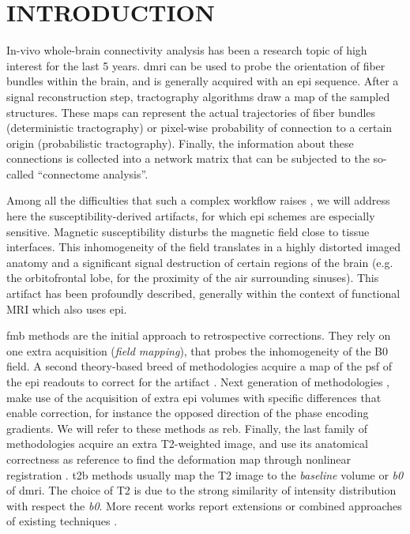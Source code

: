 \section{INTRODUCTION}
\label{sec:intro}
In-vivo whole-brain connectivity analysis has been a
research topic of high interest for the last
5 years. 
\Gls*{dmri} can be used to probe the
orientation of fiber bundles within the brain,
and is generally acquired with an \gls*{epi} sequence.
After a signal reconstruction step, 
tractography algorithms draw a map of the sampled 
structures.
These maps can represent the actual trajectories
of fiber bundles (deterministic tractography) or
pixel-wise probability of connection to a certain origin
(probabilistic tractography). Finally, the
information about these connections is collected
into a network matrix that can be subjected to
the so-called ``connectome analysis''.

Among all the difficulties that such a complex workflow
raises \cite{jones_twenty-five_2010}, we will
address here the susceptibility-derived artifacts,
for which \Gls*{epi} schemes are especially sensitive.
Magnetic susceptibility disturbs the magnetic field 
close to tissue interfaces. This inhomogeneity 
of the field translates in a highly distorted imaged 
anatomy and a significant signal destruction of 
certain regions of the brain 
(e.g. the orbitofrontal lobe, for the proximity of the
air surrounding sinuses). This artifact has been
profoundly described, generally within the context of
functional MRI which also uses
\gls*{epi}. 

\Gls*{fmb} methods \cite{jezzard_correction_1995} are
the initial approach to retrospective corrections. 
They rely on one extra acquisition (\emph{field mapping}),
that probes the inhomogeneity of the B0 field.
A second theory-based breed of methodologies acquire a 
map of the \acrlong*{psf} of the \gls*{epi} readouts to correct 
for the artifact \cite{robson_measurement_1997}. 
Next generation of methodologies \cite{cordes_geometric_2000,
chiou_simple_2000}, make use of the acquisition of 
extra \gls*{epi} volumes 
with specific differences that enable correction, for instance
the opposed direction of the phase encoding gradients. We will
refer to these methods as \gls*{reb}.
Finally, the last family of methodologies acquire an 
extra T2-weighted image, and use its anatomical correctness 
as reference to find the deformation map through nonlinear 
registration \cite{kybic_unwarping_2000,studholme_accurate_2000}.
\gls*{t2b} methods usually map
the T2 image to the \emph{baseline} volume or \textit{b0}
of \gls*{dmri}. The choice of T2 is due to the strong
similarity of intensity distribution with respect the \textit{b0}.
More recent works report extensions or combined
approaches of existing techniques
\cite{andersson_how_2003,zaitsev_point_2004,%
holland_efficient_2010,andersson_comprehensive_2012}.

